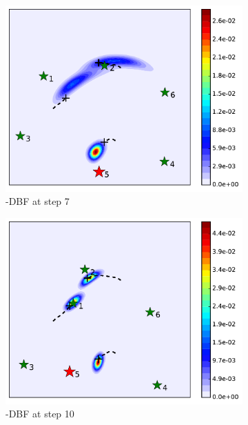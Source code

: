 \begin{figure}
\begin{subfigure}[b]{0.23\textwidth}
			\includegraphics[width=\textwidth]{figures/dbf_hetero_mov_sen_mov_tar_rbt5_step7}
			\caption{\proto-DBF at step 7}\label{fig:step7}
		\end{subfigure}
		\begin{subfigure}[b]{0.23\textwidth}
			\includegraphics[width=\textwidth]{figures/dbf_hetero_mov_sen_mov_tar_rbt5_step10}
			\caption{\proto-DBF at step 10}\label{fig:step10}
		\end{subfigure}
		\begin{subfigure}[b]{0.23\textwidth}

\end{subfigure}
\end{figure}
